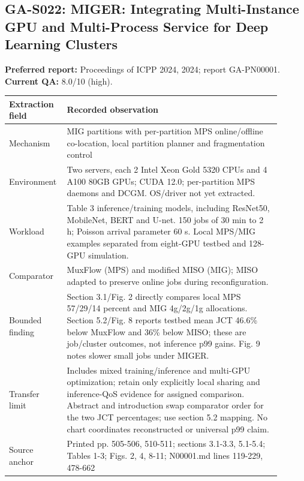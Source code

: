 \subsection{GA-S022: MIGER: Integrating Multi-Instance GPU and Multi-Process Service for Deep Learning Clusters}
\textbf{Preferred report:} Proceedings of ICPP 2024, 2024; report GA-PN00001. \textbf{Current QA:} 8.0/10 (high).
\begin{longtable}{P{0.15\linewidth}P{0.75\linewidth}}
\toprule Extraction field & Recorded observation\\\midrule\endhead
Mechanism & MIG partitions with per-partition MPS online/offline co-location, local partition planner and fragmentation control\\
Environment & Two servers, each 2 Intel Xeon Gold 5320 CPUs and 4 A100 80GB GPUs; CUDA 12.0; per-partition MPS daemons and DCGM. OS/driver not yet extracted.\\
Workload & Table 3 inference/training models, including ResNet50, MobileNet, BERT and U-net. 150 jobs of 30 min to 2 h; Poisson arrival parameter 60 s. Local MPS/MIG examples separated from eight-GPU testbed and 128-GPU simulation.\\
Comparator & MuxFlow (MPS) and modified MISO (MIG); MISO adapted to preserve online jobs during reconfiguration.\\
Bounded finding & Section 3.1/Fig. 2 directly compares local MPS 57/29/14 percent and MIG 4g/2g/1g allocations. Section 5.2/Fig. 8 reports testbed mean JCT 46.6\% below MuxFlow and 36\% below MISO; these are job/cluster outcomes, not inference p99 gains. Fig. 9 notes slower small jobs under MIGER.\\
Transfer limit & Includes mixed training/inference and multi-GPU optimization; retain only explicitly local sharing and inference-QoS evidence for assigned comparison. Abstract and introduction swap comparator order for the two JCT percentages; use section 5.2 mapping. No chart coordinates reconstructed or universal p99 claim.\\
Source anchor & Printed pp. 505-506, 510-511; sections 3.1-3.3, 5.1-5.4; Tables 1-3; Figs. 2, 4, 8-11; N00001.md lines 119-229, 478-662\\
\bottomrule\end{longtable}
